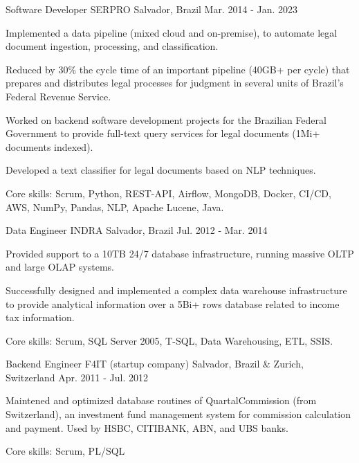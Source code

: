 \begin{cventries}
\cventry
{Software Developer} %
{SERPRO} %
{Salvador, Brazil} %
{Mar. 2014 - Jan. 2023} %
{ %
\begin{cvitems}
	\item{Implemented a data pipeline (mixed cloud and on-premise), to automate legal document ingestion, processing, and classification.}
	\item{Reduced by 30\% the cycle time of an important pipeline (40GB+ per cycle) that prepares and distributes legal processes for judgment in several units of Brazil’s Federal Revenue Service.}
	\item{Worked on backend software development projects for the Brazilian Federal Government to provide full-text query services for legal documents (1Mi+ documents indexed).}
	\item{Developed a text classifier for legal documents based on NLP techniques.}
	\item{Core skills: Scrum, Python, REST-API, Airflow, MongoDB, Docker, CI/CD, AWS, NumPy, Pandas, NLP, Apache Lucene, Java.}
\end{cvitems}
}


\cventry
{Data Engineer} %
{INDRA} %
{Salvador, Brazil} %
{Jul. 2012 - Mar. 2014} %
{ %
\begin{cvitems}
	\item{Provided support to a 10TB 24/7 database infrastructure, running massive OLTP and large OLAP systems.}
	\item{Successfully designed and implemented a complex data warehouse infrastructure to provide analytical information over a 5Bi+ rows database related to income tax information.}
	\item{Core skills: Scrum, SQL Server 2005, T-SQL, Data Warehousing, ETL, SSIS.}
\end{cvitems} 
}


\cventry
{Backend Engineer} %
{F4IT (startup company)} %
{Salvador, Brazil \& Zurich, Switzerland} %
{Apr. 2011 - Jul. 2012} %
{ %
\begin{cvitems}
	\item{Maintened and optimized database routines of QuartalCommission (from Switzerland), an investment fund management system for commission calculation and payment. Used by HSBC, CITIBANK, ABN, and UBS banks.}
	\item{Core skills: Scrum, PL/SQL}
\end{cvitems}
}


\end{cventries}
